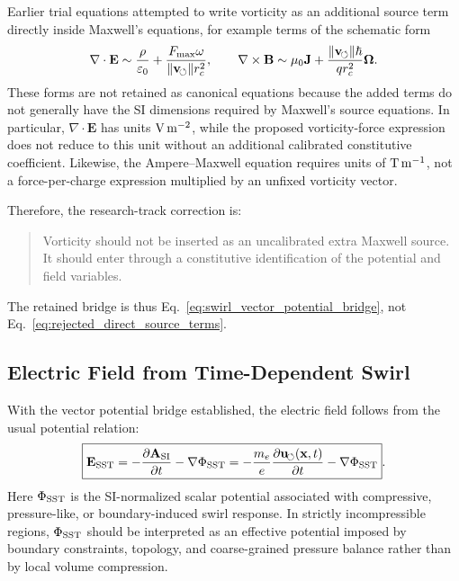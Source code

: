     Earlier trial equations attempted to write vorticity as an additional
    source term directly inside Maxwell's equations, for example terms of the
    schematic form
    \begin{equation}
        \nabla\cdot\mathbf{E}
        \sim
        \frac{\rho}{\varepsilon_0}
        +
        \frac{F_{\max}\omega}{\lVert\mathbf{v}_{\!\boldsymbol{\circlearrowleft}}\rVert r_c^2},
        \qquad
        \nabla\times\mathbf{B}
        \sim
        \mu_0\mathbf{J}
        +
        \frac{\lVert\mathbf{v}_{\!\boldsymbol{\circlearrowleft}}\rVert\hbar}{qr_c^2}\boldsymbol{\Omega}.
        \label{eq:rejected_direct_source_terms}
    \end{equation}
    These forms are not retained as canonical equations because the added
    terms do not generally have the SI dimensions required by Maxwell's
    source equations.  In particular,
    \(\nabla\cdot\mathbf{E}\) has units
    \({\rm V\,m^{-2}}\), while the proposed vorticity-force expression does
    not reduce to this unit without an additional calibrated constitutive
    coefficient.  Likewise, the Ampere--Maxwell equation requires units of
    \({\rm T\,m^{-1}}\), not a force-per-charge expression multiplied by an
    unfixed vorticity vector.
    
    Therefore, the research-track correction is:
    
    \begin{quote}
        Vorticity should not be inserted as an uncalibrated extra Maxwell source.
        It should enter through a constitutive identification of the potential and
        field variables.
    \end{quote}
    
    The retained bridge is thus Eq.~\eqref{eq:swirl_vector_potential_bridge},
    not Eq.~\eqref{eq:rejected_direct_source_terms}.

\subsection{Electric Field from Time-Dependent Swirl}
    
    With the vector potential bridge established, the electric field follows
    from the usual potential relation:
    \begin{equation}
        \boxed{
            \mathbf{E}_{\rm SST}
            =
            -\frac{\partial\mathbf{A}_{\rm SI}}{\partial t}
            -
            \nabla\Phi_{\rm SST}
            =
            -\frac{m_e}{e}
            \frac{\partial\mathbf{u}_{\!\boldsymbol{\circlearrowleft}}(\mathbf{x},t)}{\partial t}
            -
            \nabla\Phi_{\rm SST}
        } .
        \label{eq:E_from_time_dependent_swirl}
    \end{equation}
    Here \(\Phi_{\rm SST}\) is the SI-normalized scalar potential associated
    with compressive, pressure-like, or boundary-induced swirl response.  In
    strictly incompressible regions, \(\Phi_{\rm SST}\) should be interpreted
    as an effective potential imposed by boundary constraints, topology, and
    coarse-grained pressure balance rather than by local volume compression.
    
